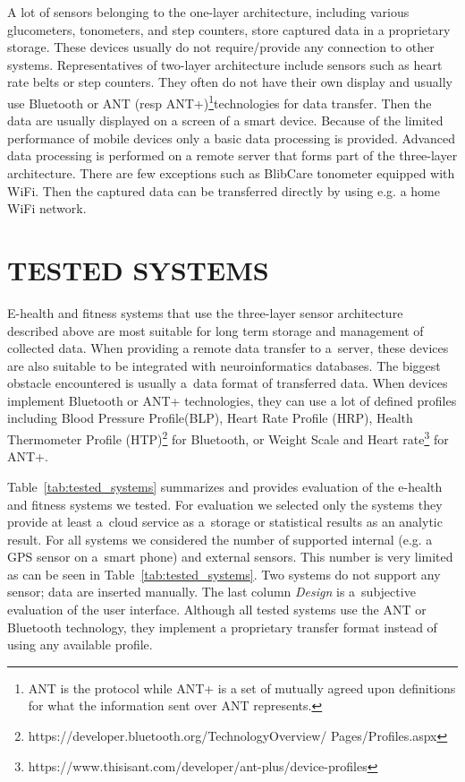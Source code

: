 \documentclass[a4paper,twoside]{article}
\begin{document}
 A lot of sensors belonging to the one-layer architecture, including various glucometers, tonometers, and step counters, store captured data in a proprietary storage. These devices usually do not require/provide any connection to other systems. Representatives of two-layer architecture include sensors such as heart rate belts or  step counters. They often do not have their own display and usually use Bluetooth or ANT (resp ANT+)\footnote{ANT is the protocol while ANT+ is a set of mutually agreed upon definitions for what the information sent over ANT represents.}technologies  for data transfer. Then the data are usually displayed on a screen of a smart device. Because of the limited performance of mobile devices only a basic data processing is provided. Advanced data processing is performed on a remote server that forms part of the three-layer architecture. There are few exceptions such as BlibCare tonometer equipped with WiFi. Then the captured data can be transferred directly by using e.g. a home WiFi network.

 

\section{\uppercase{Tested systems}}
\label{tested_systems}
\noindent

E-health and fitness systems that use the three-layer sensor architecture described above are most suitable for long term storage and management of collected data. When providing a remote data transfer to a~server, these devices are also suitable to be integrated with neuroinformatics databases. The biggest obstacle encountered is usually a~data format of transferred data. When devices implement Bluetooth or ANT+ technologies, they can use a lot of defined profiles including Blood Pressure Profile(BLP), Heart Rate Profile (HRP), Health Thermometer Profile (HTP)\footnote{https://developer.bluetooth.org/TechnologyOverview/ Pages/Profiles.aspx} for Bluetooth, or Weight Scale and Heart rate\footnote{https://www.thisisant.com/developer/ant-plus/device-profiles} for ANT+.

Table~\ref{tab:tested_systems} summarizes and provides evaluation of the e-health and fitness systems we tested. For evaluation we selected only the systems they provide at least a~cloud service as a~storage or statistical results as an analytic result. For all systems we considered the number of supported internal (e.g. a GPS sensor on a~smart phone) and external sensors. This number is very limited as can be seen in Table~\ref{tab:tested_systems}. Two systems do not support any sensor; data are inserted manually. The last column \emph{Design} is a~subjective evaluation of the user interface. Although all tested systems use the ANT or Bluetooth technology, they implement a proprietary transfer format instead of using any available profile.
\end{document}
